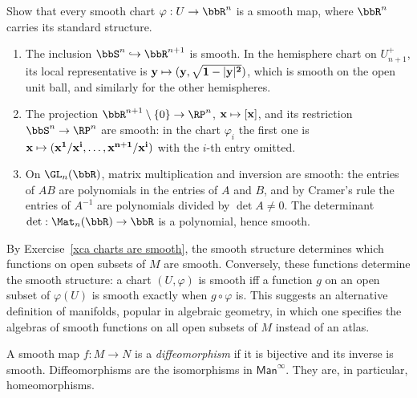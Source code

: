 \begin{xca}\label{xca charts are smooth}
    Show that every smooth chart $\varphi:U\to\bbR^n$ is a smooth map, where $\bbR^n$ carries its standard structure.
\end{xca}

\begin{example}\label{example smooth maps}
    \begin{enumerate}
        \item The inclusion $\bbS^n\hookrightarrow\bbR^{n+1}$ is smooth. In the hemisphere chart on $U_{n+1}^+$, its local representative is $\bf{y}\mapsto(\bf{y},\sqrt{1-\lvert\bf{y}\rvert^2})$, which is smooth on the open unit ball, and similarly for the other hemispheres.
        \item The projection $\bbR^{n+1}\setminus\{0\}\to\RP^n$, $\bf{x}\mapsto[\bf{x}]$, and its restriction $\bbS^n\to\RP^n$ are smooth: in the chart $\varphi_i$ the first one is $\bf{x}\mapsto(x^1/x^i,\ldots,x^{n+1}/x^i)$ with the $i$-th entry omitted.
        \item On $\GL_n(\bbR)$, matrix multiplication and inversion are smooth: the entries of $AB$ are polynomials in the entries of $A$ and $B$, and by Cramer's rule the entries of $A^{-1}$ are polynomials divided by $\det A\neq0$. The determinant $\det:\Mat_n(\bbR)\to\bbR$ is a polynomial, hence smooth.
    \end{enumerate}
\end{example}

\begin{rem}
    By Exercise~\ref{xca charts are smooth}, the smooth structure determines which functions on open subsets of $M$ are smooth. Conversely, these functions determine the smooth structure: a chart $(U,\varphi)$ is smooth iff a function $g$ on an open subset of $\varphi(U)$ is smooth exactly when $g\circ\varphi$ is. This suggests an alternative definition of manifolds, popular in algebraic geometry, in which one specifies the algebras of smooth functions on all open subsets of $M$ instead of an atlas.
\end{rem}

\begin{defn}[Diffeomorphisms]
    A smooth map $f:M\to N$ is a \emph{diffeomorphism} if it is bijective and its inverse is smooth. Diffeomorphisms are the isomorphisms in $\mathsf{Man}^\infty$. They are, in particular, homeomorphisms.
\end{defn}

